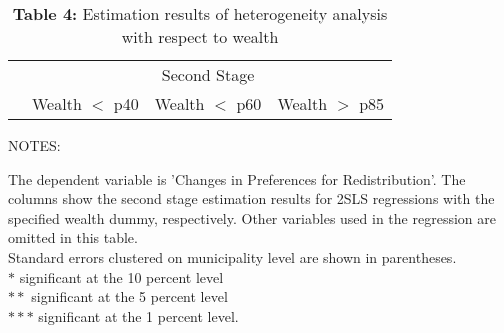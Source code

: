 \documentclass[12pt,a4paper]{standalone}
\newcommand\tab[1][1cm]{\hspace*{#1}}
\newcommand\tabs[1][0.8cm]{\hspace*{#1}}
\newcommand\tabu[1][0.4cm]{\hspace*{#1}}
\begin{document}
\begin{minipage}[c][11cm]{1.2 \textwidth}

\thispagestyle{empty}

\begin{table}
\centering
\caption*{\textbf{Table 4:} Estimation results of heterogeneity analysis with respect to wealth}

\begin{threeparttable}
\begin{tabular}{lccc}

    \toprule
    & \multicolumn{3}{c}{Second Stage} \\ 
    \cmidrule(lr){2-4}
    & Wealth $<$ p40 & Wealth $<$ p60 & Wealth $>$ p85 \\

    \midrule
 

    \bottomrule
\end{tabular}

    \begin{tablenotes}
    \item NOTES:
	\par
	\begingroup
	\leftskip=0.3cm %
	\noindent 
	The dependent variable is 'Changes in Preferences for 		Redistribution'. The columns show the second stage 			estimation results for 2SLS regressions with the 			specified wealth dummy, respectively. Other variables 		used in the regression are omitted in this table.\\
    Standard errors clustered on municipality level are 		shown in parentheses. \\
    $ \ast $ \tab significant at the 10 percent level \\
    $ \ast \ast $ \tabs significant at the 5 percent level 	\\
    $ \ast \ast \ast $ \tabu significant at the 1 percent 		level.
	\par
	\endgroup




    \end{tablenotes}
\end{threeparttable}
\end{table}

\end{minipage}
\end{document}
